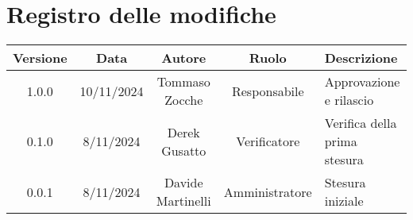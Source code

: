 
\section*{Registro delle modifiche}
\begin{table}[H]
    \begin{tabular}{|c|c|c|c|p{4cm}|}
        \hline
         \textbf{Versione} &  \textbf{Data} &  \textbf{Autore} &  \textbf{Ruolo} & \textbf{Descrizione} \\
          \hline
          1.0.0 & 10/11/2024 & Tommaso Zocche & Responsabile & Approvazione e rilascio \\
          \hline
          0.1.0& 8/11/2024& Derek Gusatto & Verificatore & Verifica della prima stesura \\
          \hline
          0.0.1 & 8/11/2024 & Davide Martinelli & Amministratore & Stesura iniziale\\
          \hline
    \end{tabular}
\end{table}